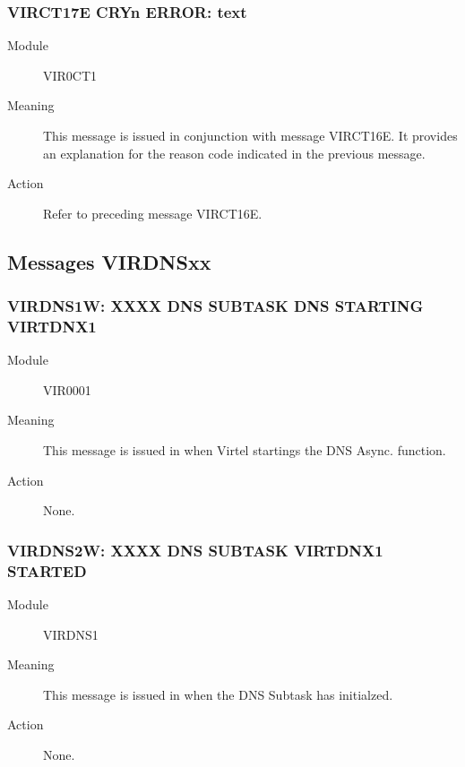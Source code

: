 \documentclass[letterpaper,10pt,english]{sphinxmanual}
\begin{document}
\subsubsection{VIRCT17E CRYn ERROR: text}
\label{\detokenize{messages:virct17e-cryn-error-text}}\begin{description}
\item[{Module}] \leavevmode
VIR0CT1

\item[{Meaning}] \leavevmode
This message is issued in conjunction with message VIRCT16E. It provides an explanation for the reason code indicated in the previous message.

\item[{Action}] \leavevmode
Refer to preceding message VIRCT16E.

\end{description}


\subsection{Messages VIRDNSxx}
\label{\detokenize{messages:messages-virdnsxx}}

\subsubsection{VIRDNS1W: XXXX DNS SUBTASK DNS STARTING VIRTDNX1}
\label{\detokenize{messages:virdns1w-xxxx-dns-subtask-dns-starting-virtdnx1}}\begin{description}
\item[{Module}] \leavevmode
VIR0001

\item[{Meaning}] \leavevmode
This message is issued in when Virtel startings the DNS Async. function.

\item[{Action}] \leavevmode
None.

\end{description}


\subsubsection{VIRDNS2W: XXXX DNS SUBTASK VIRTDNX1 STARTED}
\label{\detokenize{messages:virdns2w-xxxx-dns-subtask-virtdnx1-started}}\begin{description}
\item[{Module}] \leavevmode
VIRDNS1

\item[{Meaning}] \leavevmode
This message is issued in when the DNS Subtask has initialzed.

\item[{Action}] \leavevmode
None.

\end{description}
\end{document}
